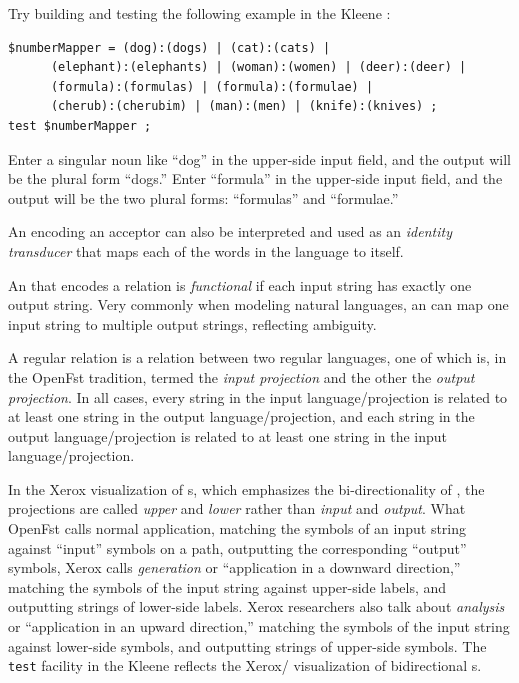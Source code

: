 Try building and testing the following example in the Kleene \gui{}:


\begin{Verbatim}
$numberMapper = (dog):(dogs) | (cat):(cats) | 
      (elephant):(elephants) | (woman):(women) | (deer):(deer) |
      (formula):(formulas) | (formula):(formulae) |
      (cherub):(cherubim) | (man):(men) | (knife):(knives) ;
test $numberMapper ;
\end{Verbatim}

\noindent
Enter a singular noun like ``dog'' in the upper-side input field, and the output
will be the plural form ``dogs.''  Enter ``formula'' in the upper-side input
field, and the output will be the two plural forms:  ``formulas'' and
``formulae.''  


An \fsm{} encoding an acceptor can also be interpreted and used as an \emph{identity transducer}
that maps each of the words in the language to itself.

An \fst{} that encodes a relation is \emph{functional} if each input string has exactly one
output string.  Very commonly when modeling natural languages, an \fst{} can map one input
string to multiple output strings, reflecting ambiguity. 

A regular relation is a relation between two regular languages, one of which is, in the
OpenFst tradition, termed the
\emph{input projection} and the other the \emph{output projection}.  In all cases, every
string in the input language/projection is related to at least one
string in the output language/projection, and each string in the output language/projection is related to at
least one string in the input language/projection.

In the Xerox
visualization of \fst{}s, which emphasizes the bi-directionality of , the projections
are called \emph{upper} and \emph{lower} rather than \emph{input} and \emph{output}.  
What OpenFst calls normal application, matching the symbols
of an input string against ``input'' symbols on a path, outputting the corresponding
``output'' symbols, Xerox calls \emph{generation} or ``application in a downward
direction,'' matching the symbols of the input string against upper-side labels, and
outputting strings of lower-side labels.  Xerox
researchers also talk about \emph{analysis} or ``application in an upward direction,'' matching the symbols of
the input string against lower-side symbols, and outputting strings of upper-side symbols. 
The \texttt{test} facility in the Kleene  reflects the Xerox/
visualization of bidirectional \fst{}s.

